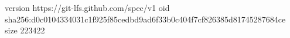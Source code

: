 version https://git-lfs.github.com/spec/v1
oid sha256:d0c0104334031c1f925f85cedbd9ad6f33b0c404f7cf826385d81745287684ce
size 223422
